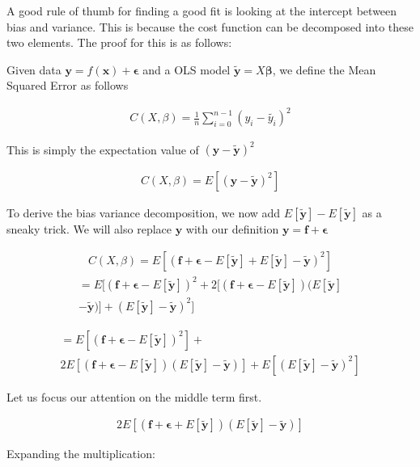 \documentclass[twocolumn,10pt,cleanfoot]{asme2ej}
\begin{document}
A good rule of thumb for finding a good fit is looking at the intercept between bias and variance. This is because the cost function can be decomposed into these two elements. The proof for this is as follows:

Given data $\bm{y} = f(\bm{x}) + \bm{\epsilon}$ and a OLS model $\bm{\tilde{y}} = X\bm{\beta}$, we define
the Mean Squared Error as follows

\begin{gather}
C(X,\beta) = \frac{1}{n}\sum_{i=0}^{n-1}(y_i - \tilde{y_i})^2
\end{gather}

This is simply the expectation value of $(\bm{y} - \bm{\tilde{y}})^2$

\begin{gather}
C(X,\beta) = E\left[(\bm{y} - \bm{\tilde{y}})^2\right]
\end{gather}

To derive the bias variance decomposition, we now add $E[\bm{\tilde{y}}] - E[\bm{\tilde{y}}]$ 
as a sneaky trick. We will also replace $\bm{y}$ with our definition $\bm{y} = \bm{f} + \bm{\epsilon}$

\begin{gather}
C(X,\beta) = E\left[(\bm{f} + \bm{\epsilon} - E[\bm{\tilde{y}}] + E[\bm{\tilde{y}}] - \bm{\tilde{y}})^2\right]
\end{gather}
\begin{multline}
= E[(\bm{f} + \bm{\epsilon} - E[\bm{\tilde{y}}])^2 + 2[(\bm{f} + \bm{\epsilon} - E[\bm{\tilde{y}}])(E[\bm{\tilde{y}}] \\
	- \bm{\tilde{y}})] +(E[\bm{\tilde{y}}] - \bm{\tilde{y}})^2]
\end{multline}

\begin{multline}
= E[(\bm{f} + \bm{\epsilon} - E[\bm{\tilde{y}}])^2] + \\
	2E[(\bm{f} + \bm{\epsilon} - E[\bm{\tilde{y}}])(E[\bm{\tilde{y}}] - \bm{\tilde{y}})] + E[(E[\bm{\tilde{y}}] - \bm{\tilde{y}})^2]
\end{multline}

Let us focus our attention on the middle term first.

\begin{gather}
2E\left[(\bm{f} + \bm{\epsilon} + E[\bm{\tilde{y}}])(E[\bm{\tilde{y}}] - \bm{\tilde{y}})\right] 
\end{gather}

Expanding the multiplication:
\end{document}
